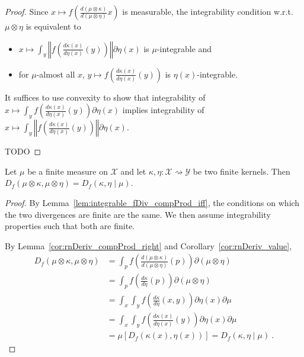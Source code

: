 \begin{proof}
Since $x \mapsto f \left(\frac{d(\mu \otimes \kappa)}{d(\mu \otimes \eta)} x \right)$ is measurable, the integrability condition w.r.t. $\mu \otimes \eta$ is equivalent to
\begin{itemize}
    \item $x \mapsto \int_y \left\Vert f \left( \frac{d\kappa(x)}{d\eta(x)}(y) \right) \right\Vert \partial \eta(x)$ is $\mu$-integrable and
    \item for $\mu$-almost all $x$, $y \mapsto f \left( \frac{d\kappa(x)}{d\eta(x)}(y) \right)$ is $\eta(x)$-integrable. 
  \end{itemize}
It suffices to use convexity to show that integrability of $x \mapsto \int_y f \left( \frac{d\kappa(x)}{d\eta(x)}(y) \right) \partial \eta(x)$ implies integrability of $x \mapsto \int_y \left\Vert f \left( \frac{d\kappa(x)}{d\eta(x)}(y) \right) \right\Vert \partial \eta(x)$.

TODO
\end{proof}

\begin{lemma}
  \label{lem:fDiv_compProd_left}
  \leanok
  Let $\mu$ be a finite measure on $\mathcal X$ and let $\kappa, \eta : \mathcal X \rightsquigarrow \mathcal Y$ be two finite kernels.
  Then $D_f(\mu \otimes \kappa, \mu \otimes \eta) = D_f(\kappa, \eta \mid \mu)$.
\end{lemma}

\begin{proof} \leanok
{}
By Lemma~\ref{lem:integrable_fDiv_compProd_iff}, the conditions on which the two divergences are finite are the same. We then assume integrability properties such that both are finite.

By Lemma~\ref{cor:rnDeriv_compProd_right} and Corollary~\ref{cor:rnDeriv_value},
\begin{align*}
D_f(\mu \otimes \kappa, \mu \otimes \eta)
&= \int_{p} f\left(\frac{d (\mu \otimes \kappa)}{d (\mu \otimes \eta)}(p)\right) \partial(\mu \otimes \eta)
\\
&= \int_{p} f\left(\frac{d \kappa}{d \eta}(p)\right) \partial(\mu \otimes \eta)
\\
&= \int_x \int_y f\left(\frac{d \kappa}{d \eta}(x, y)\right) \partial \eta(x) \partial \mu
\\
&= \int_x \int_y f\left(\frac{d \kappa(x)}{d \eta(x)}(y)\right) \partial \eta(x) \partial \mu
\\
&= \mu\left[D_f(\kappa(x), \eta(x))\right]
= D_f(\kappa, \eta \mid \mu)
\: .
\end{align*}
\end{proof}


